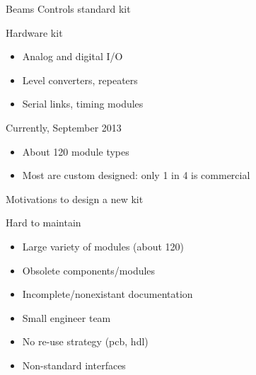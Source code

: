 \documentclass[compress,red]{beamer}
\begin{document}
\begin{frame}{Beams Controls standard kit}

  \begin{block}{Hardware kit}
    \begin{itemize}
    \item Analog and digital I/O
    \item Level converters, repeaters
    \item Serial links, timing modules
    \end{itemize}
  \end{block}

  \begin{block}{Currently, September 2013}
    \begin{itemize}
    \item About 120 module types %
    \item Most are custom designed: only 1 in 4 is commercial
    \end{itemize}
  \end{block}

\end{frame}

\begin{frame}{Motivations to design a new kit}


  \begin{block}{Hard to maintain}
    \begin{itemize}
    \item Large variety of modules (about 120)
    \item Obsolete components/modules
    \item Incomplete/nonexistant documentation
    \item Small engineer team %
    \item No re-use strategy (pcb, hdl)
    \item Non-standard interfaces %
    \end{itemize}
  \end{block}

\end{frame}
\end{document}
